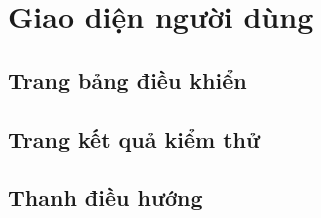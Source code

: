\section{Giao diện người dùng}
\subsection{Trang bảng điều khiển}
\subsection{Trang kết quả kiểm thử}
\subsection{Thanh điều hướng}
